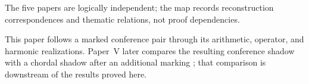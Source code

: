The five papers are logically independent; the map records reconstruction
correspondences and thematic relations, not proof dependencies.

This paper follows a marked conference pair through its arithmetic,
operator, and harmonic realizations.  Paper~V later compares the resulting
conference shadow with a chordal shadow after an additional marking
\cite{RuddCompanion2026}; that comparison is downstream of the results proved
here.
